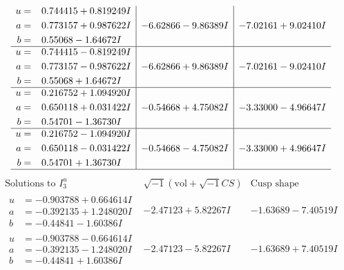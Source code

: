 \documentclass[1p]{elsarticle_modified}
\theoremstyle{definition}
\newcommand{\I}{\sqrt{-1}}
\begin{document}
$$\begin{array}{c|c|c}
\begin{aligned}
u &= \phantom{-}0.744415 + 0.819249 I \\
a &= \phantom{-}0.773157 + 0.987622 I \\
b &= \phantom{-}0.55068 - 1.64672 I\end{aligned}
 & -6.62866 - 9.86389 I & -7.02161 + 9.02410 I \\ \hline\begin{aligned}
u &= \phantom{-}0.744415 - 0.819249 I \\
a &= \phantom{-}0.773157 - 0.987622 I \\
b &= \phantom{-}0.55068 + 1.64672 I\end{aligned}
 & -6.62866 + 9.86389 I & -7.02161 - 9.02410 I \\ \hline\begin{aligned}
u &= \phantom{-}0.216752 + 1.094920 I \\
a &= \phantom{-}0.650118 + 0.031422 I \\
b &= \phantom{-}0.54701 - 1.36730 I\end{aligned}
 & -0.54668 + 4.75082 I & -3.33000 - 4.96647 I \\ \hline\begin{aligned}
u &= \phantom{-}0.216752 - 1.094920 I \\
a &= \phantom{-}0.650118 - 0.031422 I \\
b &= \phantom{-}0.54701 + 1.36730 I\end{aligned}
 & -0.54668 - 4.75082 I & -3.33000 + 4.96647 I\\
 \hline 
 \end{array}$$\newpage$$\begin{array}{c|c|c}  
\text{Solutions to }I^u_{3}& \I (\text{vol} + \sqrt{-1}CS) & \text{Cusp shape}\\
 \hline 
\begin{aligned}
u &= -0.903788 + 0.664614 I \\
a &= -0.392135 + 1.248020 I \\
b &= -0.44841 - 1.60386 I\end{aligned}
 & -2.47123 + 5.82267 I & -1.63689 - 7.40519 I \\ \hline\begin{aligned}
u &= -0.903788 - 0.664614 I \\
a &= -0.392135 - 1.248020 I \\
b &= -0.44841 + 1.60386 I\end{aligned}
 & -2.47123 - 5.82267 I & -1.63689 + 7.40519 I \\ \hline\begin{aligned}

\end{aligned}
\end{array}$$
\end{document}
